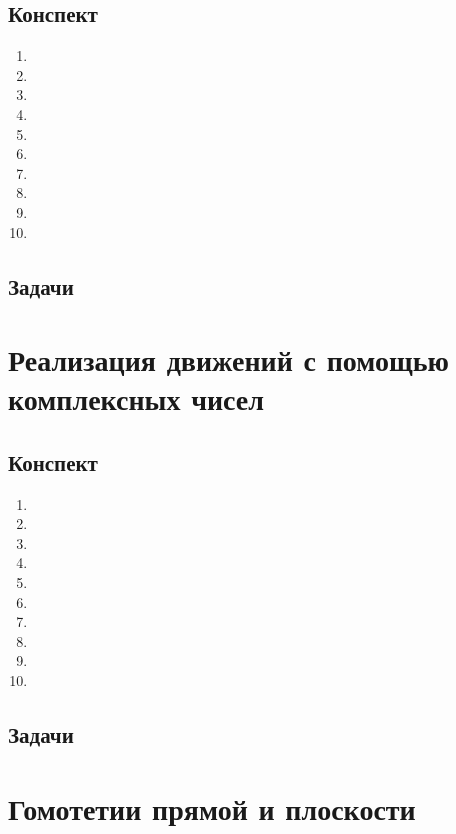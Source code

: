 \subsection{Конспект}
\begin{enumerate}\setlength{\itemsep}{1pt}
\item 
\item 
\item 
\item 
\item 
\item 
\item 
\item 
\item 
\item 
\end{enumerate}
\subsection{Задачи}



\section{Реализация движений с помощью комплексных чисел}

\subsection{Конспект}
\begin{enumerate}\setlength{\itemsep}{1pt}
\item 
\item 
\item 
\item 
\item 
\item 
\item 
\item 
\item 
\item 
\end{enumerate}
\subsection{Задачи}



\section{Гомотетии прямой и плоскости}

